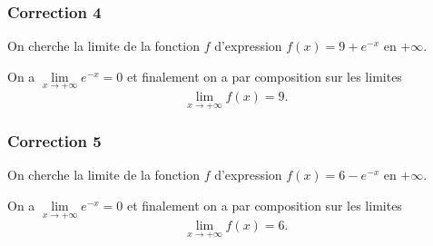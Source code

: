 \documentclass[15pt, mathserif]{beamer}
\begin{document}
\begin{frame}
\vspace{-10mm}
	\frametitle{Correction 4}
On cherche la limite de la fonction $f$ d'expression $f(x) = 9+e^{-x}$ en $+\infty$.

On a $\lim\limits_{x \rightarrow +\infty} e^{-x} = 0$ et finalement on a par composition sur les limites \[\lim\limits_{x \rightarrow +\infty}f(x) = 9.\]
\end{frame}


\begin{frame}
\vspace{-10mm}
	\frametitle{Correction 5}
On cherche la limite de la fonction $f$ d'expression $f(x) = 6-e^{-x}$ en $+\infty$.

On a $\lim\limits_{x \rightarrow +\infty} e^{-x} = 0$ et finalement on a par composition sur les limites \[\lim\limits_{x \rightarrow +\infty}f(x) = 6.\]
\end{frame}
\end{document}
